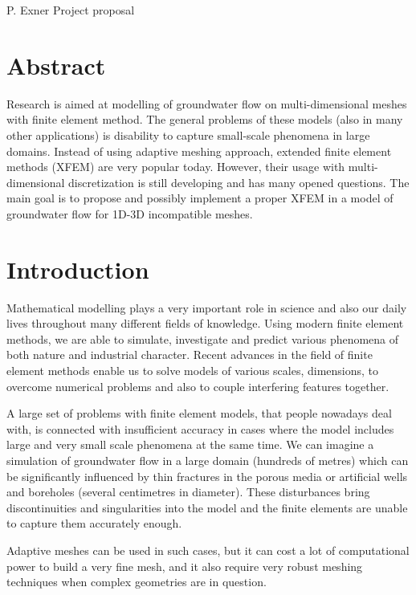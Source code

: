 \documentclass{sna}
\begin{document}
     {P. Exner}
     {Project proposal}


\section{Abstract}
Research is aimed at modelling of groundwater flow on multi-dimensional meshes with finite element method. 
The general problems of these models (also in many other applications) is disability to capture small-scale 
phenomena in large domains. Instead of using adaptive meshing approach, extended finite element methods (XFEM) 
are very popular today. However, their usage with multi-dimensional discretization is still developing 
and has many opened questions. The main goal is to propose and possibly implement a proper XFEM in 
a model of groundwater flow for 1D-3D incompatible meshes.

\section{Introduction}
Mathematical modelling plays a very important role in science and also our daily lives throughout many different
fields of knowledge. Using modern finite element methods, we are able to simulate, investigate and predict
various phenomena of both nature and industrial character. Recent advances in the field of finite element methods
enable us to solve models of various scales, dimensions, to overcome numerical problems and also 
to couple interfering features together.

A large set of problems with finite element models, that people nowadays deal with, is connected with 
insufficient accuracy in cases where the model includes large and very small scale phenomena at the same time.
We can imagine a simulation of groundwater flow in a large domain (hundreds of metres) which can be significantly
influenced by thin fractures in the porous media or artificial wells and boreholes (several centimetres in diameter).
These disturbances bring discontinuities and singularities into the model and the finite elements are
unable to capture them accurately enough.

Adaptive meshes can be used in such cases, but it can cost a lot of computational power to build a very fine mesh,
and it also require very robust meshing techniques when complex geometries are in question.
\end{document}
